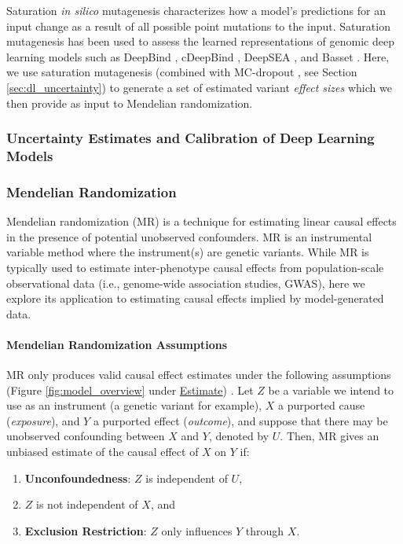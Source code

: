 Saturation \emph{in silico} mutagenesis characterizes how a model's predictions for an input change as a result of all possible point mutations to the input. Saturation mutagenesis has been used to assess the learned representations of genomic deep learning models such as DeepBind \citep{alipanahi2015predicting}, cDeepBind \citep{gandhi2018cdeepbind}, DeepSEA \citep{zhou2015predicting}, and Basset \citep{kelley2016basset}. Here, we use saturation mutagenesis (combined with MC-dropout \citep{gal2016dropout}, see Section \ref{sec:dl_uncertainty}) to generate a set of estimated variant \textit{effect sizes} which we then provide as input to Mendelian randomization.

\subsubsection{Uncertainty Estimates and Calibration of Deep Learning Models}

\subsubsection{Mendelian Randomization}
Mendelian randomization (MR) is a technique for estimating linear causal effects in the presence of potential unobserved confounders. MR is an instrumental variable method where the instrument(s) are genetic variants. While MR is typically used to estimate inter-phenotype causal effects from population-scale observational data (i.e., genome-wide association studies, GWAS), here we explore its application to estimating causal effects implied by model-generated data.

\paragraph{Mendelian Randomization Assumptions}
\label{par:rel_work_mr_assumptions}
MR only produces valid causal effect estimates under the following assumptions (Figure \ref{fig:model_overview} under \underline{Estimate}) \cite{lawlor2008mendelian}. Let $ Z $ be a variable we intend to use as an instrument (a genetic variant for example), $ X $ a purported cause (\textit{exposure}), and $ Y $ a purported effect (\textit{outcome}), and suppose that there may be unobserved confounding between $ X $ and $ Y $, denoted by $ U $. Then, MR gives an unbiased estimate of the causal effect of $X$ on $Y$ if:
\begin{enumerate}
    \item \textbf{Unconfoundedness}: $ Z $ is independent of $ U $, \label{item:mr_ass_1}
    \item $ Z $ is not independent of $ X $,  and \label{item:mr_ass_2}
    \item \textbf{Exclusion Restriction}: $ Z $ only influences $ Y $ through $ X $. \label{item:mr_ass_3}
\end{enumerate}


